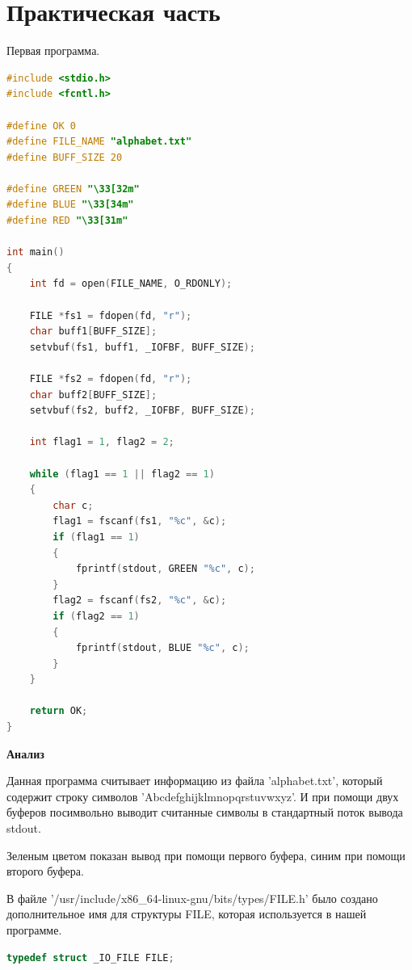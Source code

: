 \documentclass[a4paper,oneside,12pt]{extreport}
\begin{document}


\section*{Практическая часть}

\begin{task}
    Первая программа.
    \begin{lstlisting}[language=C]
#include <stdio.h>
#include <fcntl.h>

#define OK 0
#define FILE_NAME "alphabet.txt"
#define BUFF_SIZE 20

#define GREEN "\33[32m"
#define BLUE "\33[34m"
#define RED "\33[31m"

int main()
{
    int fd = open(FILE_NAME, O_RDONLY); 

    FILE *fs1 = fdopen(fd, "r");
    char buff1[BUFF_SIZE];
    setvbuf(fs1, buff1, _IOFBF, BUFF_SIZE); 

    FILE *fs2 = fdopen(fd, "r");
    char buff2[BUFF_SIZE];
    setvbuf(fs2, buff2, _IOFBF, BUFF_SIZE);

    int flag1 = 1, flag2 = 2;

    while (flag1 == 1 || flag2 == 1)
    {
        char c;
        flag1 = fscanf(fs1, "%c", &c);
        if (flag1 == 1)
        {
            fprintf(stdout, GREEN "%c", c);
        }
        flag2 = fscanf(fs2, "%c", &c);
        if (flag2 == 1)
        {
            fprintf(stdout, BLUE "%c", c);
        }
    }

    return OK;
}
    \end{lstlisting}

    \newpage

    \begin{center}
        \textbf{Анализ}        
    \end{center}

    Данная программа считывает информацию из файла 'alphabet.txt', который содержит строку символов 'Abcdefghijklmnopqrstuvwxyz'.
    И при помощи двух буферов посимвольно выводит считанные символы в стандартный поток вывода stdout.  

    Зеленым цветом показан вывод при помощи первого буфера, синим при помощи второго буфера.
    
    В файле '/usr/include/x86\_64-linux-gnu/bits/types/FILE.h' было создано дополнительное 
    имя для структуры FILE, которая используется в нашей программе.
    \begin{lstlisting}[language=C]
        typedef struct _IO_FILE FILE;
    \end{lstlisting}


\end{task}
\end{document}

